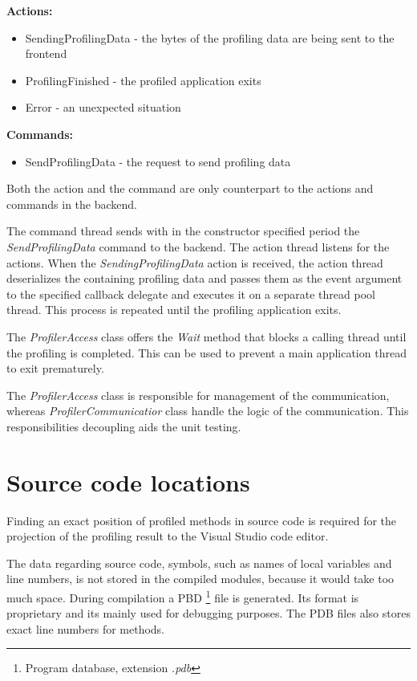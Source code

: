 \textbf{Actions:}
\begin{itemize}	
\item	SendingProfilingData - the bytes of the profiling data are being sent to the frontend
\item	ProfilingFinished - the profiled application exits
\item   Error - an unexpected situation
\end{itemize}

\textbf{Commands:}
\begin{itemize}	
\item	SendProfilingData - the request to send profiling data
\end{itemize}

Both the action and the command are only counterpart to the actions and commands in the backend.

The command thread sends with in the constructor specified period the \textit{SendProfilingData} command to the backend. The action thread listens for the actions. When the \textit{SendingProfilingData} action is received, the action thread deserializes the containing profiling data and passes them as the event argument to the specified callback delegate and executes it on a separate thread pool thread. This process is repeated until the profiling application exits.

The \textit{ProfilerAccess} class offers the \textit{Wait} method that blocks a calling thread until the profiling is completed. This can be used to prevent a main application thread to exit prematurely.

The \textit{ProfilerAccess} class is responsible for management of the communication, whereas \textit{ProfilerCommunicatior} class handle the logic of the communication. This responsibilities decoupling aids the unit testing.

\section{Source code locations}
Finding an exact position of profiled methods in source code is required for the projection of the profiling result to the Visual Studio code editor. 

The data regarding source code, symbols, such as names of local variables and line numbers, is not stored in the compiled modules, because it would take too much space. During compilation a PBD \footnote{Program database, extension \textit{.pdb}} file is generated. Its format is proprietary and its mainly used for debugging purposes. The PDB files also stores exact line numbers for methods.

